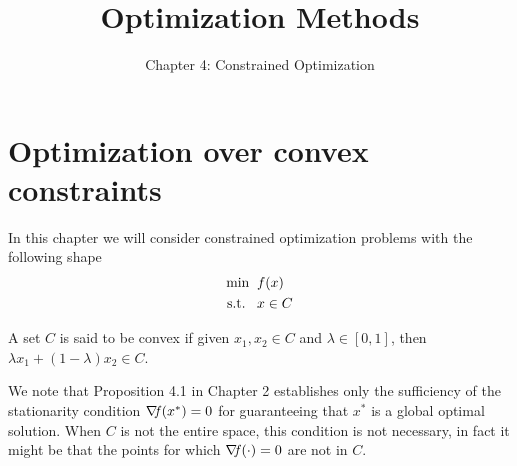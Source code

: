 \documentclass[10pt,a4paper]{article}
\title{Optimization Methods}
\author{Chapter 4: Constrained Optimization}
\date{}
\begin{document}
	\maketitle
	\section{Optimization over convex constraints}
	In this chapter we will consider constrained optimization problems with the following shape
	\begin{equation}\label{eq:problem}
		\begin{split}
			\min \;\; &f(x)\\
			\text{s.t.} \;\;\;& x \in C
		\end{split}
	\end{equation}
\begin{definition}
	A set $C$ is said to be convex if given $x_1,x_2\in C$ and $\lambda\in [0,1]$, then $\lambda x_1 +(1-\lambda) x_2 \in C.$
\end{definition}
We note that Proposition 4.1 in Chapter 2 establishes only the sufficiency of the stationarity condition $\operatorname*{\mathit{\nabla \!f}}(x^*) = 0$ for guaranteeing that $x^*$ is a global optimal solution. When $C$ is not the
entire space, this condition is not necessary, in fact it might be that the points for which $\operatorname*{\mathit{\nabla \!f}}(\cdot)=0$ are not in $C$.\\
\end{document}
